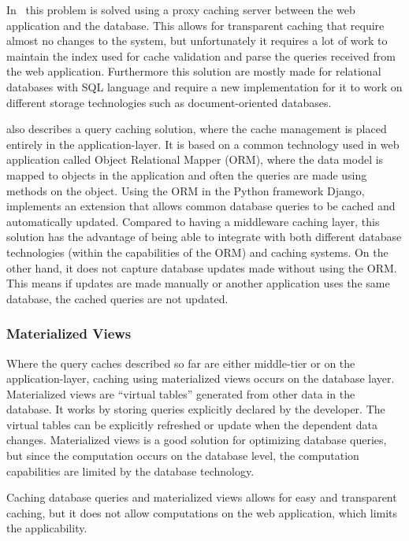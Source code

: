 In~\cite{paper:transparent-caching, paper:cosar} this problem is solved using a proxy caching server between the web application and the database. This allows for transparent caching that require almost no changes to the system, but unfortunately it requires a lot of work to maintain the index used for cache validation and parse the queries received from the web application. Furthermore this solution are mostly made for relational databases with SQL language and require a new implementation for it to work on different storage technologies such as document-oriented databases.

\cite{paper:cache-genie} also describes a query caching solution, where the cache management is placed entirely in the application-layer. It is based on a common technology used in web application called Object Relational Mapper (ORM), where the data model is mapped to objects in the application and often the queries are made using methods on the object. Using the ORM in the Python framework Django, \cite{paper:cache-genie} implements an extension that allows common database queries to be cached and automatically updated. Compared to having a middleware caching layer, this solution has the advantage of being able to integrate with both different database technologies (within the capabilities of the ORM) and caching systems. On the other hand, it does not capture database updates made without using the ORM. This means if updates are made manually or another application uses the same database, the cached queries are not updated.


\subsubsection{Materialized Views}
\label{ssub:Materialized Views}

Where the query caches described so far are either middle-tier or on the application-layer, caching using materialized views occurs on the database layer. Materialized views are “virtual tables” generated from other data in the database. It works by storing queries explicitly declared by the developer. The virtual tables can be explicitly refreshed or update when the dependent data changes. Materialized views is a good solution for optimizing database queries, but since the computation occurs on the database level, the computation capabilities are limited by the database technology.

Caching database queries and materialized views allows for easy and transparent caching, but it does not allow computations on the web application, which limits the applicability.

